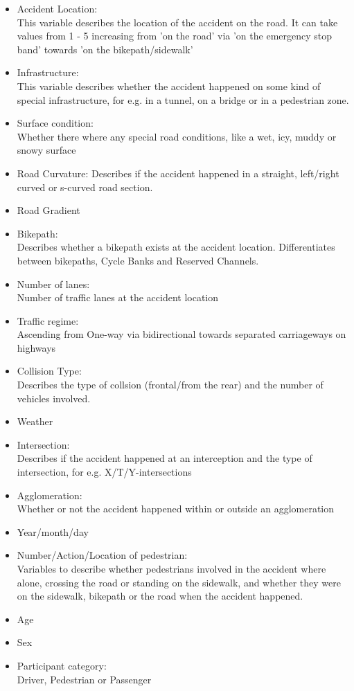 \documentclass{article}
\begin{document}
\begin{itemize}
    \item Accident Location:\\
    This variable describes the location of the accident on the road. It can take values from 1 - 5 increasing from 'on the road' via 'on the emergency stop band' towards 'on the bikepath/sidewalk'
    \item Infrastructure:\\
    This variable describes whether the accident happened on some kind of special infrastructure, for e.g. in a tunnel, on a bridge or in a pedestrian zone. 
    \item Surface condition:\\
    Whether there where any special road conditions, like a wet, icy, muddy or snowy surface
    \item Road Curvature:
    Describes if the accident happened in a straight, left/right curved or s-curved road section.
    \item Road Gradient
    \item Bikepath:\\
    Describes whether a bikepath exists at the accident location. Differentiates between bikepaths, Cycle Banks and Reserved Channels.
    \item Number of lanes:\\
    Number of traffic lanes at the accident location
    \item Traffic regime:\\
    Ascending from One-way via bidirectional towards separated carriageways on highways
    \item Collision Type: \\
    Describes the type of collsion (frontal/from the rear) and the number of vehicles involved.
    \item Weather
    \item Intersection:\\
    Describes if the accident happened at an interception and the type of intersection, for e.g. X/T/Y-intersections
    \item Agglomeration:\\
    Whether or not the accident happened within or outside an agglomeration
    \item Year/month/day
    \item Number/Action/Location of pedestrian:\\
    Variables to describe whether pedestrians involved in the accident where alone, crossing the road or standing on the sidewalk, and whether they were on the sidewalk, bikepath or the road when the accident happened. 
    \item Age
    \item Sex
    \item Participant category:\\
    Driver, Pedestrian or Passenger

\end{itemize}
\fi
\iffalse
\end{document}
